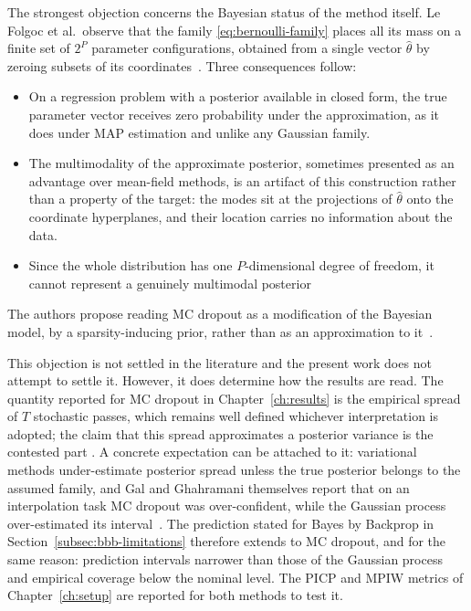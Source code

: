 The strongest objection concerns the Bayesian status of the method itself. Le Folgoc et al.\ observe that the family \eqref{eq:bernoulli-family} places all its mass on a finite set of $2^P$ parameter configurations, obtained from a single vector $\hat{\theta}$ by zeroing subsets of its coordinates~\cite{lefolgoc2021}. Three consequences follow:
\begin{itemize}
    \item On a regression problem with a posterior available in closed form, the true parameter vector receives zero probability under the  approximation, as it does under MAP estimation and unlike any Gaussian family.
    \item The multimodality of the approximate posterior, sometimes presented as an advantage over mean-field methods, is an artifact of this construction rather than a property of the target: the modes sit at the projections of $\hat{\theta}$ onto the coordinate hyperplanes, and their location carries no information about the data.
    \item Since the whole distribution has one $P$-dimensional degree of freedom, it cannot represent a genuinely multimodal posterior
\end{itemize}
The authors propose reading MC dropout as a modification of the Bayesian model, by a sparsity-inducing prior, rather than as an approximation to it~\cite{lefolgoc2021}.

This objection is not settled in the literature and the present work does not attempt to settle it. However, it does determine how the results are read. The quantity reported for MC dropout in Chapter~\ref{ch:results} is the empirical spread of $T$ stochastic passes, which remains well defined whichever interpretation is adopted; the claim that this spread approximates a posterior
variance is the contested part . A concrete expectation can be attached to it: variational methods under-estimate posterior spread unless the true posterior belongs to the assumed family, and Gal and Ghahramani themselves report that on an interpolation task MC dropout was over-confident, while the Gaussian process over-estimated its interval~\cite{gal2016appendix}. The prediction stated for Bayes by Backprop in Section~\ref{subsec:bbb-limitations} therefore extends to MC
dropout, and for the same reason: prediction intervals narrower than those of the Gaussian process and empirical coverage below the nominal level. The PICP and MPIW metrics of Chapter~\ref{ch:setup} are reported for both methods to test it.

